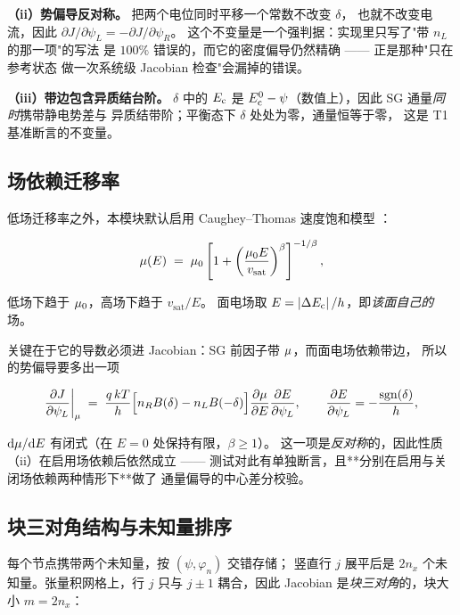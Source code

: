 \textbf{（ii）势偏导反对称。} 把两个电位同时平移一个常数不改变 $\delta$，
也就不改变电流，因此 $\partial J/\partial\psi_L = -\partial J/\partial\psi_R$。
这个不变量是一个强判据：实现里只写了"带 $n_L$ 的那一项"的写法
是 $100\%$ 错误的，而它的密度偏导仍然精确 —— 正是那种"只在参考状态
做一次系统级 Jacobian 检查"会漏掉的错误。

\textbf{（iii）带边包含异质结台阶。} $\delta$ 中的 $E_{\mathrm{c}}$ 是
$E_{\mathrm{c}}^0-\psi$（数值上），因此 SG 通量\emph{同时}携带静电势差与
异质结带阶；平衡态下 $\delta$ 处处为零，通量恒等于零，
这是 T1 基准断言的不变量。

\subsection{场依赖迁移率}
\label{sec:dd-mobility}

低场迁移率之外，本模块默认启用 Caughey--Thomas 速度饱和模型
\cite{caugheyThomas1967}：

\begin{equation}
\mu(E) \;=\; \mu_0\left[1+\left(\frac{\mu_0 E}{v_{\text{sat}}}\right)^{\beta}\right]^{-1/\beta},
\label{eq:dd-mobility}
\end{equation}

低场下趋于 $\mu_0$，高场下趋于 $v_{\text{sat}}/E$。
面电场取 $E=\left\lvert \Delta E_{\mathrm{c}} \right\rvert/h$，即\emph{该面自己的}场。

关键在于它的导数必须进 Jacobian：SG 前因子带 $\mu$，而面电场依赖带边，
所以  的势偏导要多出一项

\begin{equation}
\frac{\partial J}{\partial \psi_L}\bigg|_{\mu} \;=\;
\frac{q\,kT}{h}\Bigl[n_R B(\delta)-n_L B(-\delta)\Bigr]\frac{\partial \mu}{\partial E}\frac{\partial E}{\partial \psi_L},
\qquad
\frac{\partial E}{\partial \psi_L} = -\frac{\operatorname{sgn}(\delta)}{h},
\label{eq:dd-mobility-chain}
\end{equation}

$\mathrm{d}\mu/\mathrm{d} E$ 有闭式（在 $E=0$ 处保持有限，$\beta\ge1$）。
这一项是\emph{反对称}的，因此性质（ii）在启用场依赖后依然成立 ——
测试对此有单独断言，且**分别在启用与关闭场依赖两种情形下**做了
通量偏导的中心差分校验。

\subsection{块三对角结构与未知量排序}
\label{sec:dd-block}

每个节点携带两个未知量，按 $(\psi,\varphi_n)$ 交错存储；
竖直行 $j$ 展平后是 $2n_x$ 个未知量。张量积网格上，行 $j$ 只与
$j\pm1$ 耦合，因此 Jacobian 是\emph{块三对角}的，块大小 $m=2n_x$：

